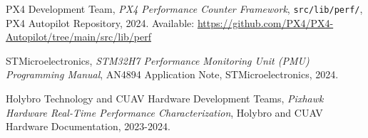 \documentclass[11pt,a4paper]{article}
\theoremstyle{definition}
\theoremstyle{remark}
\begin{document}
\begin{thebibliography}{14}
PX4 Development Team,
\textit{PX4 Performance Counter Framework},
\texttt{src/lib/perf/}, PX4 Autopilot Repository, 2024.
Available: \url{https://github.com/PX4/PX4-Autopilot/tree/main/src/lib/perf}

STMicroelectronics,
\textit{STM32H7 Performance Monitoring Unit (PMU) Programming Manual},
AN4894 Application Note, STMicroelectronics, 2024.

Holybro Technology and CUAV Hardware Development Teams,
\textit{Pixhawk Hardware Real-Time Performance Characterization},
Holybro and CUAV Hardware Documentation, 2023-2024.

\end{thebibliography}
\end{document}
